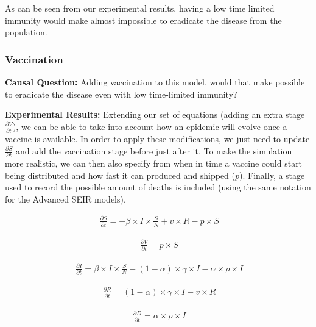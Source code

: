 As can be seen from our experimental results, having a low time limited immunity would make almost impossible to eradicate the disease from the population. 

\subsubsection{Vaccination}

\textbf{Causal Question:} Adding vaccination to this model, would that make possible to eradicate the disease even with low time-limited immunity?

\textbf{Experimental Results:} Extending our set of equations (adding an extra stage $\frac{\partial V}{\partial t}$), we can be able to take into account how an epidemic will evolve once a vaccine is available. In order to apply these modifications, we just need to update $\frac{\partial S}{\partial t}$ and add the vaccination stage before just after it. To make the simulation more realistic, we can then also specify from when in time a vaccine could start being distributed and how fast it can produced and shipped ($p$). Finally, a stage used to record the possible amount of deaths is included (using the same notation for the Advanced SEIR models).

\useshortskip
\begin{align}
\ \frac{\partial S}{\partial t} = -\beta \times I \times \frac{S}{N} + v \times R - p \times S
\end{align}
\useshortskip

\useshortskip
\begin{align}
\ \frac{\partial V}{\partial t} = p \times S
\end{align}
\useshortskip

\useshortskip
\begin{align}
\ \frac{\partial I}{\partial t} = \beta \times I \times \frac{S}{N}  -(1-\alpha) \times \gamma \times I -\alpha \times \rho \times I
\end{align}
\useshortskip

\useshortskip
\begin{align}
\ \frac{\partial R}{\partial t} = (1-\alpha) \times \gamma \times I - v \times R
\end{align}
\useshortskip

\useshortskip
\begin{align}
\ \frac{\partial D}{\partial t} = \alpha \times \rho \times I
\end{align}
\useshortskip


